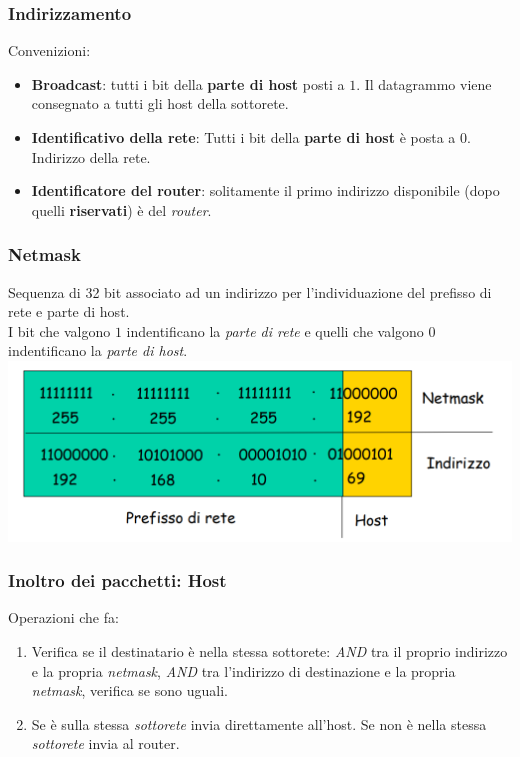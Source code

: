 \subsubsection{Indirizzamento}
Convenizioni:
\begin{itemize}
  \item \textbf{Broadcast}: tutti i bit della \textbf{parte di host} posti a $1$. Il datagrammo viene consegnato a tutti gli host della sottorete. 
  \item \textbf{Identificativo della rete}: Tutti i bit della \textbf{parte di host} è posta a $0$. Indirizzo della rete.
  \item \textbf{Identificatore del router}: solitamente il primo indirizzo disponibile (dopo quelli \textbf{riservati}) è del \textit{router}.
\end{itemize}

\subsubsection{Netmask}
Sequenza di 32 bit associato ad un indirizzo per l'individuazione del prefisso di rete e parte di host.  \\ 
I bit che valgono $1$ indentificano la \textit{parte di rete} e quelli che valgono $0$ indentificano la \textit{parte di host}. \\  
\includegraphics[width=\textwidth]{./img/netmask.png} 

\subsubsection{Inoltro dei pacchetti: Host}
Operazioni che fa:
\begin{enumerate}
  \item Verifica se il destinatario è nella stessa sottorete: \textit{AND} tra il proprio indirizzo e la propria \textit{netmask}, \textit{AND} tra l'indirizzo di destinazione e la propria \textit{netmask}, verifica se sono uguali.
  \item Se è sulla stessa \textit{sottorete} invia direttamente all'host. Se non è nella stessa \textit{sottorete} invia al router.  
\end{enumerate}

